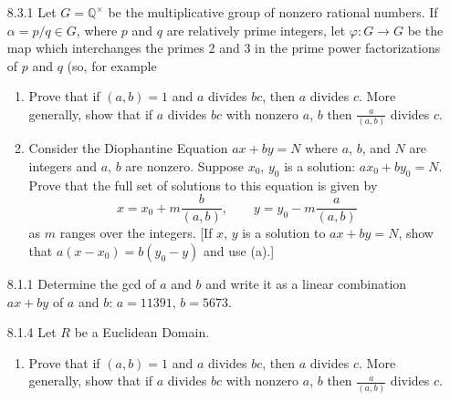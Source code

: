 \documentclass[9pt]{article}
\newcommand{\Q}{\mathbb{Q}}
\begin{document}
\begin{enumerate}
   \item[8.3.1]   Let $G = \Q^\times$ be the multiplicative group of nonzero
                  rational numbers. If $\alpha = p/q \in G$, where $p$ and $q$
                  are relatively prime integers, let
                  $\varphi : G \rightarrow G$ be the map which interchanges the
                  primes 2 and 3 in the prime power factorizations of $p$ and
                  $q$ (so, for example
                  \begin{enumerate}
                     \item Prove that if $(a, b) = 1$ and $a$ divides $bc$, then
                           $a$ divides $c$. More generally, show that if $a$
                           divides $bc$ with nonzero $a$, $b$ then
                           $\frac{a}{(a, b)}$ divides $c$.
                     \item Consider the Diophantine Equation $ax + by = N$ where
                           $a$, $b$, and $N$ are integers and $a$, $b$ are
                           nonzero. Suppose $x_0$, $y_0$ is a solution:
                           $ax_0 + by_0 = N$. Prove that the full set of
                           solutions to this equation is given by
                           $$x = x_0 + m\frac{b}{(a, b)}, \qquad
                             y = y_0 - m\frac{a}{(a, b)}$$
                           as $m$ ranges over the integers. [If $x$, $y$ is a
                           solution to $ax + by = N$, show that
                           $a(x - x_0) = b(y_0 - y)$ and use (a).]
                  \end{enumerate}
   \item[8.1.1]   Determine the gcd of $a$ and $b$ and write it as a linear
                  combination $ax + by$ of $a$ and $b$: $a = 11391$, $b = 5673$.
   \item[8.1.4]   Let $R$ be a Euclidean Domain.
                  \begin{enumerate}
                     \item Prove that if $(a, b) = 1$ and $a$ divides $bc$, then
                           $a$ divides $c$. More generally, show that if $a$
                           divides $bc$ with nonzero $a$, $b$ then
                           $\frac{a}{(a, b)}$ divides $c$.

\end{enumerate}
\end{enumerate}
\end{document}
